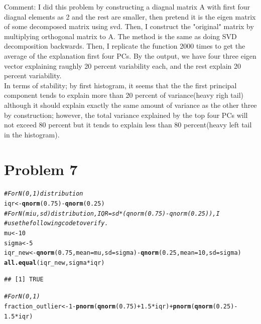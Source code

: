 \documentclass{article}\usepackage[]{graphicx}\usepackage[]{color}
\makeatletter
\newcommand{\hlnum}[1]{\textcolor[rgb]{0.686,0.059,0.569}{#1}}%
\newcommand{\hlcom}[1]{\textcolor[rgb]{0.678,0.584,0.686}{\textit{#1}}}%
\newcommand{\hlopt}[1]{\textcolor[rgb]{0,0,0}{#1}}%
\newcommand{\hlstd}[1]{\textcolor[rgb]{0.345,0.345,0.345}{#1}}%
\newcommand{\hlkwb}[1]{\textcolor[rgb]{0.69,0.353,0.396}{#1}}%
\newcommand{\hlkwc}[1]{\textcolor[rgb]{0.333,0.667,0.333}{#1}}%
\newcommand{\hlkwd}[1]{\textcolor[rgb]{0.737,0.353,0.396}{\textbf{#1}}}%
\newenvironment{kframe}{%
 \def\at@end@of@kframe{}%
 \ifinner\ifhmode%
  \def\at@end@of@kframe{\end{minipage}}%
  \begin{minipage}{\columnwidth}%
 \fi\fi%
 \def\FrameCommand##1{\hskip\@totalleftmargin \hskip-\fboxsep
 \colorbox{shadecolor}{##1}\hskip-\fboxsep
     \hskip-\linewidth \hskip-\@totalleftmargin \hskip\columnwidth}%
 \MakeFramed {\advance\hsize-\width
   \@totalleftmargin\z@ \linewidth\hsize
   \@setminipage}}%
 {\par\unskip\endMakeFramed%
 \at@end@of@kframe}
\newenvironment{knitrout}{}{} %
\makeatother
\begin{document}
Comment: I did this problem by constructing a diagnal matrix A with first four diagnal elements as 2 and the rest are smaller, then pretend it is the eigen matrix of some decomposed matrix using svd. Then, I construct the "original" matrix by multiplying orthogonal matrix to A. The method is the same as doing SVD decomposition backwards. Then, I replicate the function 2000 times to get the average of the explanation first four PCs. By the output, we have four three eigen vector explaining raughly 20 percent variability each, and the rest explain 20 percent variability.\\
        In terms of stability; by first histogram, it seems that the the first principal component tends to explain more than 20 percent of variance(heavy righ tail) although it should explain exactly the same amount of variance as the other three by construction; however, the total variance explained by the top four PCs will not exceed 80 percent but it tends to explain less than 80 percent(heavy left tail in the histogram).

\section*{Problem 7}
\begin{knitrout}
\color{fgcolor}\begin{kframe}
\begin{alltt}
\hlcom{# For N(0,1) distribution}
\hlstd{iqr} \hlkwb{<-} \hlkwd{qnorm}\hlstd{(}\hlnum{0.75}\hlstd{)} \hlopt{-} \hlkwd{qnorm}\hlstd{(}\hlnum{0.25}\hlstd{)}
\hlcom{# For N(miu, sd) distribution, IQR = sd*(qnorm(0.75) - qnorm(0.25)), I}
\hlcom{# use the following code to verify.}
\hlstd{mu} \hlkwb{<-} \hlnum{10}
\hlstd{sigma} \hlkwb{<-} \hlnum{5}
\hlstd{iqr_new} \hlkwb{<-} \hlkwd{qnorm}\hlstd{(}\hlnum{0.75}\hlstd{,} \hlkwc{mean} \hlstd{= mu,} \hlkwc{sd} \hlstd{= sigma)} \hlopt{-} \hlkwd{qnorm}\hlstd{(}\hlnum{0.25}\hlstd{,} \hlkwc{mean} \hlstd{=} \hlnum{10}\hlstd{,} \hlkwc{sd} \hlstd{= sigma)}
\hlkwd{all.equal}\hlstd{(iqr_new, sigma} \hlopt{*} \hlstd{iqr)}
\end{alltt}
\begin{verbatim}
## [1] TRUE
\end{verbatim}
\begin{alltt}
\hlcom{# For N(0,1)}
\hlstd{fraction_outlier} \hlkwb{<-} \hlnum{1} \hlopt{-} \hlkwd{pnorm}\hlstd{(}\hlkwd{qnorm}\hlstd{(}\hlnum{0.75}\hlstd{)} \hlopt{+} \hlnum{1.5} \hlopt{*} \hlstd{iqr)} \hlopt{+} \hlkwd{pnorm}\hlstd{(}\hlkwd{qnorm}\hlstd{(}\hlnum{0.25}\hlstd{)} \hlopt{-}
    \hlnum{1.5} \hlopt{*} \hlstd{iqr)}
\end{alltt}
\end{kframe}
\end{knitrout}
\end{document}
